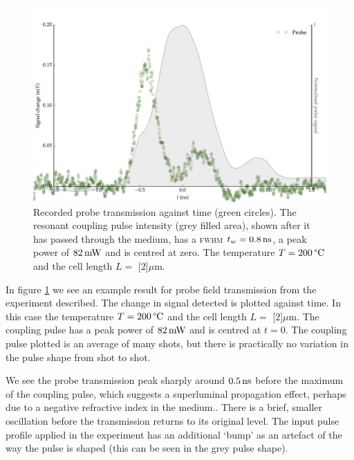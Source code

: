     \begin{figure}[h]
      \includegraphics[width=\linewidth]
        {figs/06_simultons/1704_temp_scaled_data_colormap_201C_fig1.pdf}
      \caption{
      Recorded probe transmission against time (green circles). The  resonant
      coupling pulse intensity (grey filled area), shown after it has passed
      through the medium, has a \textsc{fwhm} $t_w = \unit[0.8]{ns}$, a peak
      power of $\unit[82]{mW}$ and is centred at zero. The temperature $T =
      \unit[200]{\textrm{\textdegree C}}$  and the cell length $L = $
      \unit[$2$]{$\mu$m}.
      }
      \label{fig:data_1704_temp_201C}
    \end{figure}

    In figure \ref{fig:data_1704_temp_201C} we see an example result for probe
    field transmission from the experiment described. The change in signal
    detected is plotted against time. In this case the temperature $T =
    \unit[200]{\textrm{\textdegree C}}$ and the cell length $L = $
    \unit[$2$]{$\mu$m}. The coupling pulse has a peak power of $\unit[82]{mW}$
    and is centred at $t\!=\!0$. The coupling pulse plotted is an average of
    many shots, but there is practically no variation in the pulse shape from
    shot to shot.

    We see the probe transmission peak sharply around $\unit[0.5]{ns}$ before
    the maximum of the coupling pulse, which suggests a superluminal propagation
    effect, perhaps due to a negative refractive index in the
    medium.\cite{Keaveney2012}. There is a brief, smaller oscillation before the
    transmission returns to its original level. The input pulse profile applied
    in the experiment has an additional `bump' as an artefact of the way the
    pulse is shaped (this can be seen in the grey pulse shape).

